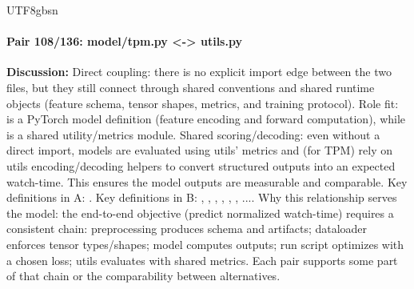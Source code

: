 \documentclass[11pt]{article}
\begin{document}
\begin{CJK*}{UTF8}{gbsn}
\paragraph{Pair 108/136: model/tpm.py <-> utils.py}
\textbf{Discussion:} Direct coupling: there is no explicit import edge between the two files, but they still connect through shared conventions and shared runtime objects (feature schema, tensor shapes, metrics, and training protocol). Role fit: \texttt{} is a PyTorch model definition (feature encoding and forward computation), while \texttt{} is a shared utility/metrics module. Shared scoring/decoding: even without a direct import, models are evaluated using utils' metrics and (for TPM) rely on utils encoding/decoding helpers to convert structured outputs into an expected watch-time. This ensures the model outputs are measurable and comparable. Key definitions in A: \texttt{}. Key definitions in B: \texttt{}, \texttt{}, \texttt{}, \texttt{}, \texttt{}, \texttt{}, .... Why this relationship serves the model: the end-to-end objective (predict normalized watch-time) requires a consistent chain: preprocessing produces schema and artifacts; dataloader enforces tensor types/shapes; model computes outputs; run script optimizes with a chosen loss; utils evaluates with shared metrics. Each pair supports some part of that chain or the comparability between alternatives.


\end{CJK*}
\end{document}
